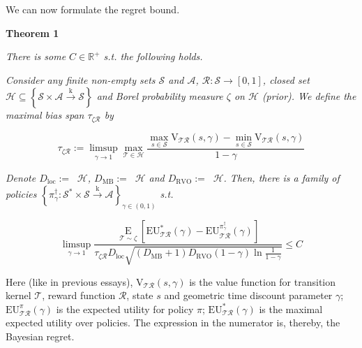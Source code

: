 \documentclass[a4paper]{article}
\newcommand{\Co}[1]{}
\newcommand{\AP}[1]{\left(#1\right)}
\newcommand{\AB}[1]{\left[#1\right]}
\newcommand{\AC}[1]{\left\{#1\right\}}
\newcommand{\Ea}[2]{\underset{#1}{\operatorname{E}}\AB{#2}}
\newcommand{\Reals}{\mathbb{R}}
\newcommand{\K}{\xrightarrow{\mathrm{k}}}
\newcommand{\St}{\mathcal{S}}
\newcommand{\A}{\mathcal{A}}
\newcommand{\R}{\mathcal{R}}
\newcommand{\T}{\mathcal{T}}
\newcommand{\Hy}{\mathcal{H}}
\DeclareMathOperator{\RVO}{\dim_{RVO}}
\DeclareMathOperator{\MB}{\dim_{MB}}
\DeclareMathOperator{\LD}{\dim_{loc}}
\newcommand{\DRVO}{D_{\mathrm{RVO}}}
\newcommand{\DMB}{D_{\mathrm{MB}}}
\newcommand{\DL}{D_{\mathrm{loc}}}
\newcommand{\V}{\mathrm{V}}
\newcommand{\EU}{\mathrm{EU}}
\begin{document}
\Co{Finally, there is a certain regularity condition in our main theorem that depends on the following parameters of MDPs.

\textbf{Definition 7}\Co{b}

\textit{Consider finite non-empty sets $\St$ and $\A$, $\R:\St\rightarrow[0,1]$ (reward function) and $\T:\St\times\A\K\St$ (transition kernel). The value function $\V_{\T\R}(s,\gamma)$ is always continuous and piecewise differentiable w.r.t. $\gamma$. Let $\partial_+\V_{\T\R}(s,\gamma)$ and $\partial_-\V_{\T\R}(s,\gamma)$ denote its right and left derivative respectively. We denote}\Co{i}

$$\partial_{\max}\V_{\T\R}(s,\gamma):=\sup_{x\in(\gamma,1)}{\partial_+\V_{\T\R}(s,x)}$$

$$\partial_{\min}\V_{\T\R}(s,\gamma):=\inf_{x\in(\gamma,1)}{\partial_-\V_{\T\R}(s,x)}$$

Note that, since $\V_{\T\R}(s,\gamma)$ is the maximum of a finite set of differentiable functions (the value functions corresponding to the deterministic stationary policies $\St\rightarrow\A$), we have $\partial_+\V_{\T\R}(s,\gamma)\geq\partial_-\V_{\T\R}(s,\gamma)$.}

We can now formulate the regret bound.

\textbf{Theorem 1}\Co{b}

\textit{There is some $C\in\Reals^+$ s.t. the following holds.}\Co{i}

\textit{Consider any finite non-empty sets $\St$ and $\A$, $\R:\St\rightarrow[0,1]$, closed set $\Hy\subseteq\AC{\St\times\A\K\St}$ and Borel probability measure $\zeta$ on $\Hy$ (prior). We define the maximal bias span $\tau_{\zeta\R}$ by}\Co{i}

$$\tau_{\zeta\R}:=\limsup_{\gamma\rightarrow1}{\max_{\T\in\Hy}\frac{\max_{s\in\St}\V_{\T\R}(s,\gamma)-\min_{s\in\St}\V_{\T\R}(s,\gamma)}{1-\gamma}}$$

\textit{Denote $\DL:=\LD{\Hy}$, $\DMB:=\MB{\Hy}$ and $\DRVO:=\RVO{\Hy}$. Then, there is a family of policies $\AC{\pi^\dagger_\gamma:\St^*\times\St\K\A}_{\gamma\in(0,1)}$ s.t.}\Co{i}

$$\limsup_{\gamma \rightarrow 1}\frac{\Ea{\T\sim\zeta}{\EU^*_{\T\R}(\gamma)-\EU^{\pi^\dagger_\gamma}_{\T\R}(\gamma)}}{\tau_{\zeta\R}\DL\sqrt{\AP{\DMB+1}\DRVO(1-\gamma)\ln{\frac{1}{1-\gamma}}}}\leq C$$

Here (like in previous essays), $\V_{\T\R}(s,\gamma)$ is the value function for transition kernel $\T$, reward function $\R$, state $s$ and geometric time discount parameter $\gamma$; $\EU^{\pi}_{\T\R}(\gamma)$ is the expected utility for policy $\pi$; $\EU^*_{\T\R}(\gamma)$ is the maximal expected utility over policies. The expression in the numerator is, thereby, the Bayesian regret.
\end{document}

